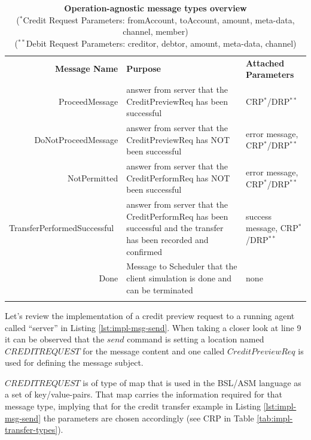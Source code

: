 \setlength{\tabcolsep}{6pt}
\begin{table}[H]
\begin{centering}
\small
{
\begin{tabular}{ r | p{6.7cm} | p{4.4cm} }
\hline
\textbf{Message Name} & \textbf{Purpose} & \textbf{Attached Parameters} \\
\Xhline{1.5pt}
ProceedMessage & answer from server that the CreditPreviewReq has been successful & CRP$^{*}$/DRP$^{**}$\\[3pt]
\hline
DoNotProceedMessage & answer from server that the CreditPreviewReq has NOT  been successful & error message, CRP$^{*}$/DRP$^{**}$\\[3pt]
\hline
NotPermitted & answer from server that the CreditPerformReq has NOT been successful & error message, CRP$^{*}$/DRP$^{**}$ \\[3pt]
\hline
TransferPerformedSuccessful\ & answer from server that the CreditPerformReq has been successful and the transfer has been recorded and confirmed & success message, CRP$^{*}$/DRP$^{**}$ \\[3pt]
\hline
Done & Message to Scheduler that the client simulation is done and can be terminated & none \\[3pt]
\Xhline{1.5pt}
\end{tabular}
}
\caption{\small\textbf{Operation-agnostic message types overview}\\
($^{*}$Credit Request Parameters: fromAccount, toAccount, amount, meta-data, channel, member)\\
($^{**}$Debit Request Parameters:  creditor, debtor, amount, meta-data, channel)}
\label{tab:impl-msg-generic-types}
\end{centering}
\vspace{-1cm}
\end{table}

Let's review the implementation of a credit preview request to a running agent called ``server'' in Listing \ref{lst:impl-msg-send}. When taking a closer look at line 9 it can be observed that the $send$ command is setting a location named $CREDITREQUEST$ for the message content and one called $CreditPreviewReq$ is used for defining the message subject.

$CREDITREQUEST$ is of type of map that is used in the BSL/ASM language as a set of key/value-pairs. That map carries the information required for that message type, implying that for the credit transfer example in Listing \ref{lst:impl-msg-send} the parameters are chosen accordingly (see CRP in Table \ref{tab:impl-transfer-types}). 

